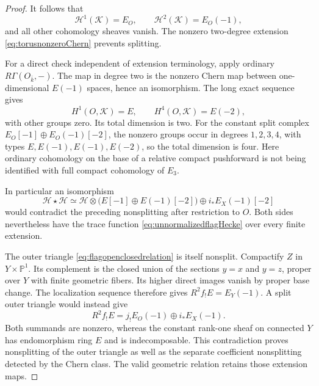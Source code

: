 \begin{proof}
It follows that
\[
 \mathcal H^1(\mathcal K)=E_O,\qquad
 \mathcal H^2(\mathcal K)=E_O(-1),
\]
and all other cohomology sheaves vanish. The nonzero
two-degree extension \eqref{eq:torusnonzeroChern} prevents
splitting.

For a direct check independent of extension terminology,
apply ordinary \(R\Gamma(O_{\bar k},-)\).
The map in degree two is the nonzero Chern map between
one-dimensional \(E(-1)\) spaces, hence an isomorphism.
The long exact sequence gives
\begin{equation}\label{eq:relativeTorusHypercohomology}
 H^1(O,\mathcal K)=E,\qquad
 H^4(O,\mathcal K)=E(-2),
\end{equation}
with other groups zero.
Its total dimension is two. For the constant split complex
\(E_O[-1]\oplus E_O(-1)[-2]\), the nonzero groups occur
in degrees \(1,2,3,4\), with types
\(E,E(-1),E(-1),E(-2)\), so the total dimension is four.
Here ordinary cohomology on the base of a relative compact
pushforward is not being identified with full compact
cohomology of \(E_3\).

In particular an isomorphism
\[
 \mathcal H\star\mathcal H\simeq
 \mathcal H\otimes\bigl(E[-1]\oplus E(-1)[-2]\bigr)
       \oplus i_*E_X(-1)[-2]
\]
would contradict the preceding nonsplitting after restriction
to \(O\).
Both sides nevertheless have the trace function
\eqref{eq:unnormalizedflagHecke} over every finite extension.

The outer triangle \eqref{eq:flagopenclosedrelation} is
itself nonsplit. Compactify \(Z\) in \(Y\times\mathbb P^1\).
Its complement is the closed union of the sections \(y=x\)
and \(y=z\), proper over \(Y\) with finite geometric fibers.
Its higher direct images vanish by proper base change.
The localization sequence therefore gives
\(R^2f_!E=E_Y(-1)\).
A split outer triangle would instead give
\[
 R^2f_!E=j_!E_O(-1)\oplus i_*E_X(-1).
\]
Both summands are nonzero, whereas the constant rank-one
sheaf on connected \(Y\) has endomorphism ring \(E\) and
is indecomposable. This contradiction proves nonsplitting
of the outer triangle as well as the separate coefficient
nonsplitting detected by the Chern class.
The valid geometric relation retains those extension maps.
\end{proof}


